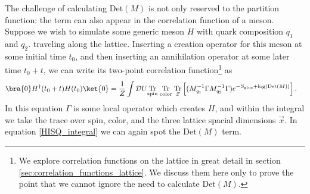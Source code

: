 The challenge of calculating $\mathrm{Det}(M)$ is not only reserved to the partition function: the term can also appear in the correlation function of a meson.  Suppose we wish to simulate some generic meson $H$ with quark composition $q_1$ and $q_2.$ traveling along the lattice.  Inserting a creation operator for this meson at some initial time $t_0$, and then inserting an annihilation operator at some later time $t_0+t$, we can write its two-point correlation function\footnote{We explore correlation functions on the lattice in great detail in section \ref{sec:correlation_functions_lattice}.  We discuss them here only to prove the point that we cannot ignore the need to calculate $\mathrm{Det}(M)$.} as
\begin{equation}\label{HISQ_integral}
    \begin{split}
        \bra{0}H^\dagger(t_0+t)H(t_0)\ket{0} &= %
        \frac{1}{Z}\int \mathcal{D}U \mathrm{\underset{spin}{Tr}}\; \mathrm{\underset{color}{Tr}}\; {\underset{\vec{x}}{\mathrm{Tr}}}\left[
        (M_{q_1}^{-1}\Gamma M_{q_2}^{-1}\Gamma)e^{-S_\mathrm{glue}+\log(\mathrm{Det}(M))}{}\right].
    \end{split}
\end{equation}
In this equation $\Gamma$ is some local operator which creates $H$, and within the integral we take the trace over spin, color, and the three lattice spacial dimensions $\vec{x}$.  In equation \ref{HISQ_integral} we can again spot the $\mathrm{Det}(M)$ term.  

